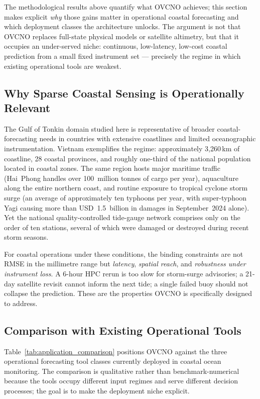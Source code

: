 \documentclass[11pt,a4paper]{article}
\begin{document}
The methodological results above quantify what OVCNO achieves; this section makes explicit \emph{why} those gains matter in operational coastal forecasting and which deployment classes the architecture unlocks. The argument is not that OVCNO replaces full-state physical models or satellite altimetry, but that it occupies an under-served niche: continuous, low-latency, low-cost coastal prediction from a small fixed instrument set --- precisely the regime in which existing operational tools are weakest.

\subsection{Why Sparse Coastal Sensing is Operationally Relevant}

The Gulf of Tonkin domain studied here is representative of broader coastal-forecasting needs in countries with extensive coastlines and limited oceanographic instrumentation. Vietnam exemplifies the regime: approximately 3{,}260\,km of coastline, 28 coastal provinces, and roughly one-third of the national population located in coastal zones. The same region hosts major maritime traffic (Hai~Phong handles over 100~million tonnes of cargo per year), aquaculture along the entire northern coast, and routine exposure to tropical cyclone storm surge (an average of approximately ten typhoons per year, with super-typhoon Yagi causing more than USD~1.5~billion in damages in September~2024 alone). Yet the national quality-controlled tide-gauge network comprises only on the order of ten stations, several of which were damaged or destroyed during recent storm seasons.

For coastal operations under these conditions, the binding constraints are not RMSE in the millimetre range but \emph{latency}, \emph{spatial reach}, and \emph{robustness under instrument loss}. A 6-hour HPC rerun is too slow for storm-surge advisories; a 21-day satellite revisit cannot inform the next tide; a single failed buoy should not collapse the prediction. These are the properties OVCNO is specifically designed to address.

\subsection{Comparison with Existing Operational Tools}

Table~\ref{tab:application_comparison} positions OVCNO against the three operational forecasting tool classes currently deployed in coastal ocean monitoring. The comparison is qualitative rather than benchmark-numerical because the tools occupy different input regimes and serve different decision processes; the goal is to make the deployment niche explicit.
\end{document}
